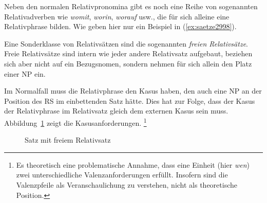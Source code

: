 
Neben den normalen Relativpronomina gibt es noch eine Reihe von sogenannten Relativadverben wie \textit{womit}, \textit{worin}, \textit{worauf} usw., die für sich alleine eine Relativphrase bilden.
Wie geben hier nur ein Beispiel in (\ref{ex:saetze2998}).

\begin{exe}
\end{exe}

Eine Sonderklasse von Relativsätzen sind die sogenannten \textit{freien Relativsätze}.
Freie Relativsätze sind intern wie jeder andere Relativsatz aufgebaut, beziehen sich aber nicht auf ein Bezugsnomen, sondern nehmen für sich allein den Platz einer NP ein.

\begin{exe}
  \ex\label{ex:saetze1991}
  \begin{xlist}
  \end{xlist}
\end{exe}


Im Normalfall muss die Relativphrase den Kasus haben, den auch eine NP an der Position des RS im einbettenden Satz hätte.
Dies hat zur Folge, dass der Kasus der Relativphrase im Relativsatz gleich dem externen Kasus sein muss.
Abbildung~\ref{fig:saetze1991b} zeigt die Kasusanforderungen.%
\footnote{Es theoretisch eine problematische Annahme, dass eine Einheit (hier \textit{wen}) zwei unterschiedliche Valenzanforderungen erfüllt.
Insofern sind die Valenzpfeile als Veranschaulichung zu verstehen, nicht als theoretische Position.}

\begin{figure}
  \centering
  \caption{Satz mit freiem Relativsatz}
  \label{fig:saetze1991b}
\end{figure}

